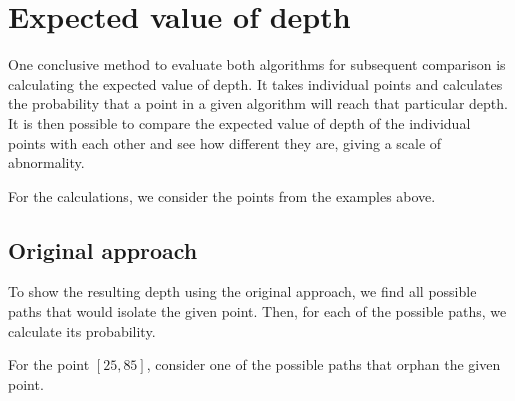 \section{Expected value of depth}
One conclusive method to evaluate both algorithms for subsequent comparison is calculating the expected value of depth. It takes individual points and calculates the probability that a point in a given algorithm will reach that particular depth. It is then possible to compare the expected value of depth of the individual points with each other and see how different they are, giving a scale of abnormality.

For the calculations, we consider the points from the examples above.

\subsection{Original approach}
To show the resulting depth using the original approach, we find all possible paths that would isolate the given point. Then, for each of the possible paths, we calculate its probability.




For the point $[25,85]$, consider one of the possible paths that orphan the given point.

